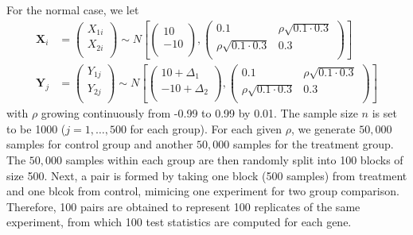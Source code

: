 \documentclass[11pt, a4paper]{article}
\begin{document}
For the normal case, we let 
\begin{equation}
	\begin{aligned}
		\bm X_i &=\left( \begin{array}{c}
			X_{1i}\\
			X_{2i}\\
		\end{array}\right)
		\sim N\left[
		\left(\begin{array}{c}
			10\\
			-10\\
		\end{array} \right), 
		\left(
		\begin{array}{cc}
			0.1 &\rho \sqrt{0.1\cdot 0.3} \\
			\rho \sqrt{0.1\cdot 0.3} & 	0.3 \\
		\end{array}
		\right)
		\right] \\
		\bm Y_j &= \left( \begin{array}{c}
			Y_{1j}\\
			Y_{2j}\\
		\end{array}\right)
		\sim N\left[
		\left(\begin{array}{c}
			10+ \Delta_1\\
			-10 + \Delta_2\\
		\end{array} \right), 
		\left(
		\begin{array}{cc}
			0.1 &\rho \sqrt{0.1\cdot 0.3} \\
			\rho \sqrt{0.1\cdot 0.3} & 	0.3 \\
		\end{array}
		\right)
		\right] 
	\end{aligned}
\end{equation}
with $\rho$ growing continuously from -0.99 to 0.99 by 0.01.  The sample size $n$ is set to be 1000 ($j =1, \ldots, 500$ for each group). For each given $\rho$, we generate $50,000$ samples for control group and another $50,000$ samples for the treatment group. The $50,000$ samples within each group are then randomly split into 100 blocks of size 500. Next, a pair is formed by taking one block (500 samples) from treatment and one blcok from control,  mimicing one experiment for two group comparison. Therefore, 100 pairs are obtained to represent 100 replicates of the same experiment, from which 100 test statistics are computed for each gene. 
\end{document}
